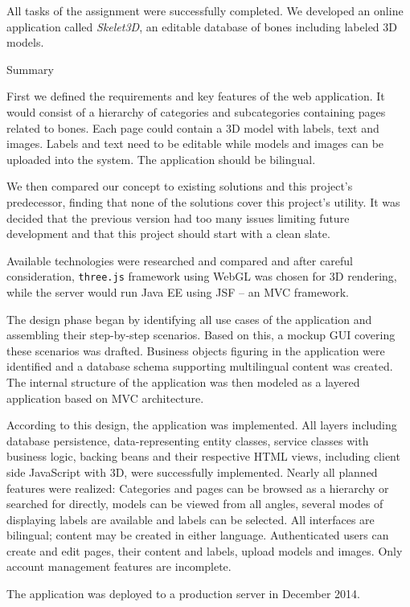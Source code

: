 All tasks of the assignment were successfully completed. We developed an online application called {\it Skelet3D}, an editable database of bones including labeled 3D models.

\sec Summary

First we defined the requirements and key features of the web application. It would consist of a hierarchy of categories and subcategories containing pages related to bones. Each page could contain a 3D model with labels, text and images. Labels and text need to be editable while models and images can be uploaded into the system. The application should be bilingual.

We then compared our concept to existing solutions and this project’s predecessor, finding that none of the solutions cover this project’s utility. It was decided that the previous version had too many issues limiting future development and that this project should start with a clean slate.

Available technologies were researched and compared and after careful consideration, {\tt three.js} framework using WebGL was chosen for 3D rendering, while the server would run Java EE using JSF -- an MVC framework.

The design phase began by identifying all use cases of the application and assembling their step-by-step scenarios. Based on this, a mockup GUI covering these scenarios was drafted. Business objects figuring in the application were identified and a database schema supporting multilingual content was created. The internal structure of the application was then modeled as a layered application based on MVC architecture.

According to this design, the application was implemented. All layers including database persistence, data-representing entity classes, service classes with business logic, backing beans and their respective HTML views, including client side JavaScript with 3D, were successfully implemented. Nearly all planned features were realized: Categories and pages can be browsed as a hierarchy or searched for directly, models can be viewed from all angles, several modes of displaying labels are available and labels can be selected. All interfaces are bilingual; content may be created in either language. Authenticated users can create and edit pages, their content and labels, upload models and images. Only account management features are incomplete.

The application was deployed to a production server in December 2014.

